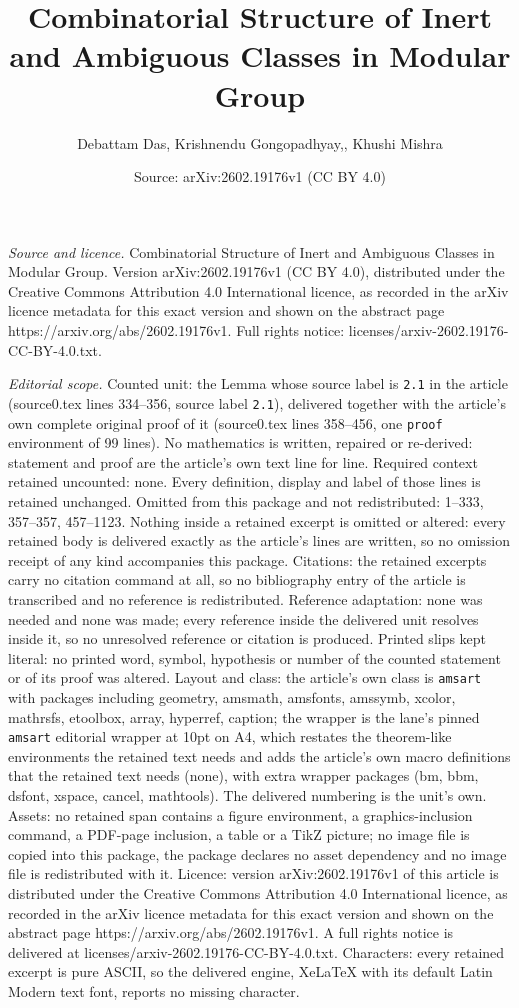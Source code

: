 \documentclass[10pt,a4paper]{amsart}
\title[Combinatorial Structure of Inert and Ambiguous Classes in Mo]{Combinatorial Structure of Inert and Ambiguous Classes in Modular Group}
\author{Debattam Das, Krishnendu Gongopadhyay,, Khushi Mishra}
\date{Source: arXiv:2602.19176v1 (CC BY 4.0)}
\begin{document}
\maketitle

\noindent\emph{Source and licence.} Combinatorial Structure of Inert and Ambiguous Classes in Modular Group. Version arXiv:2602.19176v1 (CC BY 4.0), distributed under the Creative Commons Attribution 4.0 International licence, as recorded in the arXiv licence metadata for this exact version and shown on the abstract page https://arxiv.org/abs/2602.19176v1. Full rights notice: licenses/arxiv-2602.19176-CC-BY-4.0.txt.\par\smallskip

\noindent\textit{Editorial scope.} Counted unit: the Lemma whose source label is \texttt{2.1} in the article (source0.tex lines 334--356, source label \texttt{2.1}), delivered together with the article's own complete original proof of it (source0.tex lines 358--456, one \texttt{proof} environment of 99 lines). No mathematics is written, repaired or re-derived: statement and proof are the article's own text line for line. Required context retained uncounted: none. Every definition, display and label of those lines is retained unchanged. Omitted from this package and not redistributed: 1--333, 357--357, 457--1123. Nothing inside a retained excerpt is omitted or altered: every retained body is delivered exactly as the article's lines are written, so no omission receipt of any kind accompanies this package. Citations: the retained excerpts carry no citation command at all, so no bibliography entry of the article is transcribed and no reference is redistributed. Reference adaptation: none was needed and none was made; every reference inside the delivered unit resolves inside it, so no unresolved reference or citation is produced. Printed slips kept literal: no printed word, symbol, hypothesis or number of the counted statement or of its proof was altered. Layout and class: the article's own class is \texttt{amsart} with packages including geometry, amsmath, amsfonts, amssymb, xcolor, mathrsfs, etoolbox, array, hyperref, caption; the wrapper is the lane's pinned \texttt{amsart} editorial wrapper at 10pt on A4, which restates the theorem-like environments the retained text needs and adds the article's own macro definitions that the retained text needs (none), with extra wrapper packages (bm, bbm, dsfont, xspace, cancel, mathtools). The delivered numbering is the unit's own. Assets: no retained span contains a figure environment, a graphics-inclusion command, a PDF-page inclusion, a table or a TikZ picture; no image file is copied into this package, the package declares no asset dependency and no image file is redistributed with it. Licence: version arXiv:2602.19176v1 of this article is distributed under the Creative Commons Attribution 4.0 International licence, as recorded in the arXiv licence metadata for this exact version and shown on the abstract page https://arxiv.org/abs/2602.19176v1. A full rights notice is delivered at licenses/arxiv-2602.19176-CC-BY-4.0.txt. Characters: every retained excerpt is pure ASCII, so the delivered engine, XeLaTeX with its default Latin Modern text font, reports no missing character.
\end{document}
